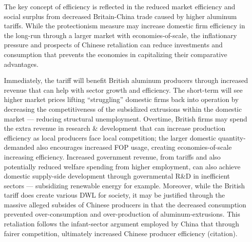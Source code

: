 \documentclass[a4paper,12pt]{article}
\newcommand{\tikzfig}[1]{}
\begin{document}
The key concept of efficiency is reflected in the reduced market efficiency and social surplus from decreased Britain-China trade caused by higher aluminum tariffs. While the protectionism measure may increase domestic firm efficiency in the long-run through a larger market with economies-of-scale, the inflationary pressure and prospects of Chinese retaliation can reduce investments and consumption that prevents the economies in capitalizing their comparative advantages.

\begin{figure}[H]
	\centering
	\tikzfig{assets/eos.txt}
	\caption{}
	\label{fig:eos}
\end{figure}

Immediately, the tariff will benefit British aluminum producers through increased revenue that can help with sector growth and efficiency. The short-term will see higher market prices lifting ``struggling'' domestic firms back into operation by decreasing the competitiveness of the subsidized extrusions within the domestic market --- reducing structural unemployment. Overtime, British firms may spend the extra revenue in research \& development that can increase production efficiency as local producers face local competition; the larger domestic quantity-demanded also encourages increased FOP usage, creating economies-of-scale increasing efficiency.
Increased government revenue, from tariffs and also potentially reduced welfare spending from higher employment, can also achieve domestic supply-side development through governmental R\&D in inefficient sectors --- subsidizing renewable energy for example. Moreover, while the British tariff does create various DWL for society, it may be justified through the massive alleged subsides of Chinese producers in that the decreased consumption prevented over-consumption and over-production of aluminum-extrusions. This retaliation follows the infant-sector argument employed by China that through fairer competition, ultimately increased Chinese producer efficiency (citation).
\end{document}
